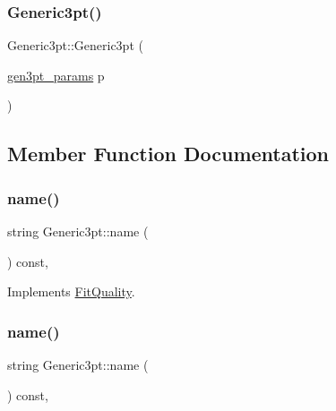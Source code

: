 \mbox{\label{classGeneric3pt_ae80fda20a523118353e7ccf5199a54a8}} 
\subsubsection{\texorpdfstring{Generic3pt()}{Generic3pt()}\hspace{0.1cm}{\footnotesize\ttfamily [4/4]}}
{\footnotesize\ttfamily Generic3pt\+::\+Generic3pt (\begin{DoxyParamCaption}\item[{\mbox{\hyperlink{structgen3pt__params}{gen3pt\+\_\+params}}}]{p }\end{DoxyParamCaption})\hspace{0.3cm}{\ttfamily [inline]}}



\subsection{Member Function Documentation}
\mbox{\label{classGeneric3pt_a669b462af539bd13514447ed387f0644}} 
\subsubsection{\texorpdfstring{name()}{name()}\hspace{0.1cm}{\footnotesize\ttfamily [1/2]}}
{\footnotesize\ttfamily string Generic3pt\+::name (\begin{DoxyParamCaption}{ }\end{DoxyParamCaption}) const\hspace{0.3cm}{\ttfamily [inline]}, {\ttfamily [virtual]}}



Implements \mbox{\hyperlink{classFitQuality_a3423e236f25d68cf822094b363a74780}{Fit\+Quality}}.

\mbox{\label{classGeneric3pt_a669b462af539bd13514447ed387f0644}} 
\subsubsection{\texorpdfstring{name()}{name()}\hspace{0.1cm}{\footnotesize\ttfamily [2/2]}}
{\footnotesize\ttfamily string Generic3pt\+::name (\begin{DoxyParamCaption}{ }\end{DoxyParamCaption}) const\hspace{0.3cm}{\ttfamily [inline]}, {\ttfamily [virtual]}}



